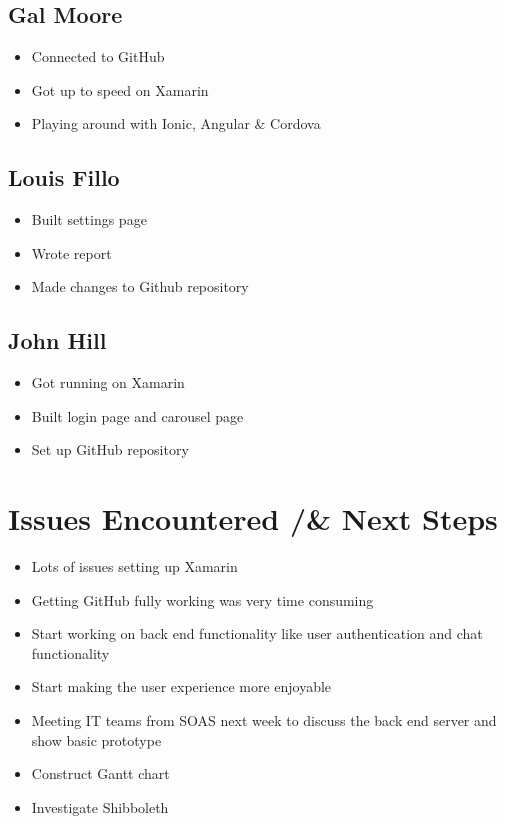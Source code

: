\documentclass[11pt]{article} \usepackage[utf8]{inputenc}
\begin{document}
\subsection{Gal Moore}
\begin{itemize}
   \item Connected to GitHub
   \item Got up to speed on Xamarin
   \item Playing around with Ionic, Angular & Cordova
\end{itemize}
 
\subsection{Louis Fillo}
\begin{itemize}
   \item Built settings page
   \item Wrote report
   \item Made changes to Github repository
\end{itemize}
 
\subsection{John Hill}
\begin{itemize}
   \item Got running on Xamarin
   \item Built login page and carousel page
   \item Set up GitHub repository
\end{itemize}
 
\section{Issues Encountered /& Next Steps}
\begin{itemize}
   \item Lots of issues setting up Xamarin
   \item Getting GitHub fully working was very time consuming
\end{itemize}
 
\begin{itemize}
   \item Start working on back end functionality like user authentication and
   chat functionality
   \item Start making the user experience more enjoyable
   \item Meeting IT teams from SOAS next week to discuss the back end server and
   show basic prototype
   \item Construct Gantt chart
   \item Investigate Shibboleth
\end{itemize}
 
\end{document}
